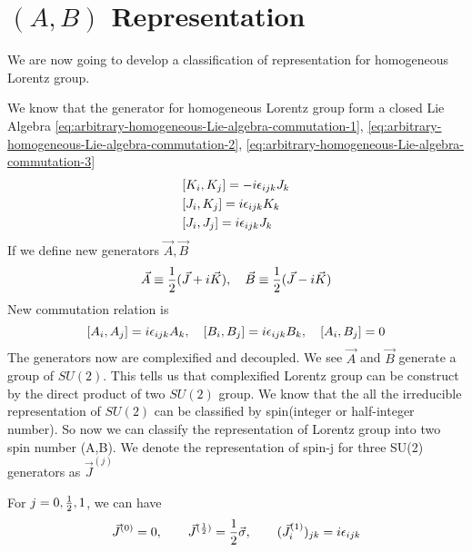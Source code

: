 \section{$(A,B)$ Representation}

We are now going to develop a classification of representation for homogeneous Lorentz group.



We know that the generator for homogeneous Lorentz group form a closed Lie Algebra \eqref{eq:arbitrary-homogeneous-Lie-algebra-commutation-1}, \eqref{eq:arbitrary-homogeneous-Lie-algebra-commutation-2}, \eqref{eq:arbitrary-homogeneous-Lie-algebra-commutation-3}
\begin{align}
&[K_i,K_j] = -i \epsilon_{ijk} J_k
\\
&[J_i,K_j] = i \epsilon_{ijk} K_k
\\
&[J_i,J_j] = i \epsilon_{ijk} J_k
\end{align}
If we define new generators $\vec{A}, \vec{B}$
\begin{equation}\label{definition of A and B}
  \vec{A} \equiv \frac{1}{2}(\vec{J}+i\vec{K}),\quad
\vec{B} \equiv \frac{1}{2}(\vec{J}-i\vec{K})
\end{equation}
New commutation relation is
\begin{equation} \label{commutation relation of A and B}
\comm{A_i}{A_j} = i \e_{ijk} A_k,\quad
\comm{B_i}{B_j} = i \e_{ijk} B_k,\quad
\comm{A_i}{B_j} = 0
\end{equation}
The generators now are complexified and decoupled. We see $\vec{A}$ and $\vec{B}$ generate a group of $SU(2)$. This tells us that complexified Lorentz group can be construct by the direct product of two $SU(2)$ group. We know that the all the irreducible representation of $SU(2)$ can be classified by spin(integer or half-integer number). So now we can classify the representation of Lorentz group into two spin number (A,B). We denote the representation of spin-j for three SU(2) generators as $\vec{J}^{(j)}$

For $j = 0 , \frac{1}{2} , 1$, we can have 
\begin{equation}\label{spin representation matrice for j = 0,1/2,1}
\vec{J}^{(0)} = 0, \qquad
\vec{J}^{(\frac{1}{2})} = \frac{1}{2} \vec{\sigma},\qquad
(\vec{J}^{(1)}_i)_{jk} = i\epsilon_{ijk}
\end{equation}
 
